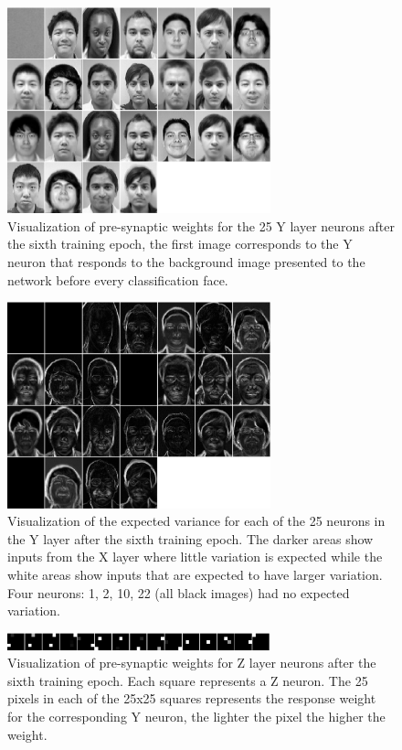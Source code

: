 \documentclass[conference]{IEEEtran}
\begin{document}
\begin{figure}
\center
\includegraphics[width=3in]{5_yneuron/epoch_5_0_xy.eps}
\caption{Visualization of pre-synaptic weights for the 25 Y layer neurons after the sixth training epoch, the first image corresponds to the Y neuron that responds to the background image presented to the network before every classification face.}
\label{fig:y_weights}
\end{figure}

\begin{figure}
\center
\includegraphics[width=3in]{5_yneuron/epoch_5_0_sigmas.eps}
\caption{Visualization of the expected variance for each of the 25 neurons in the Y layer after the sixth training epoch.  The darker areas show inputs from the X layer where little variation is expected while the white areas show inputs that are expected to have larger variation.  Four neurons: 1, 2, 10, 22 (all black images) had no expected variation.}
\label{fig:y_sigmas}
\end{figure}

\begin{figure}
\center
\includegraphics[width=3in]{5_yneuron/epoch_5_0_yz.eps}
\caption{Visualization of pre-synaptic weights for Z layer neurons after the sixth training epoch.  Each square represents a Z neuron.  The 25 pixels in each of the 25x25 squares represents the response weight for the corresponding Y neuron, the lighter the pixel the higher the weight.}
\label{fig:z_weights}
\end{figure}
\end{document}

